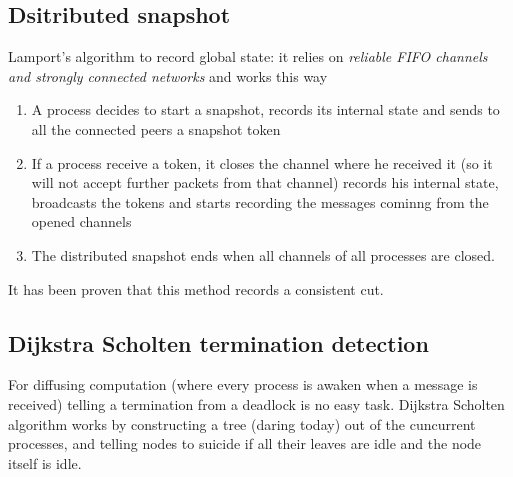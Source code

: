 \documentclass[10pt,a4paper]{article}
\begin{document}
			\subsection{Dsitributed snapshot}
				Lamport's algorithm to record global state: it relies on \emph{reliable FIFO channels and strongly connected networks} and works this way
				\begin{enumerate}
					\item A process decides to start a snapshot, records its internal state and sends to all the connected peers a snapshot token
					\item If a process receive a token, it closes the channel where he received it (so it will not accept further packets from that channel) records his internal state, broadcasts the tokens and starts recording the messages cominng from the opened channels
					\item The distributed snapshot ends when all channels of all processes are closed.
				\end{enumerate}
				It has been proven that this method records a consistent cut. 
			
			\subsection{Dijkstra Scholten termination detection}
				For diffusing computation (where every process is awaken when a message is received) telling a termination from a deadlock is no easy task. Dijkstra Scholten algorithm works by constructing a tree (daring today) out of the cuncurrent processes, and telling nodes to suicide if all their leaves are idle and the node itself is idle.
\end{document}
